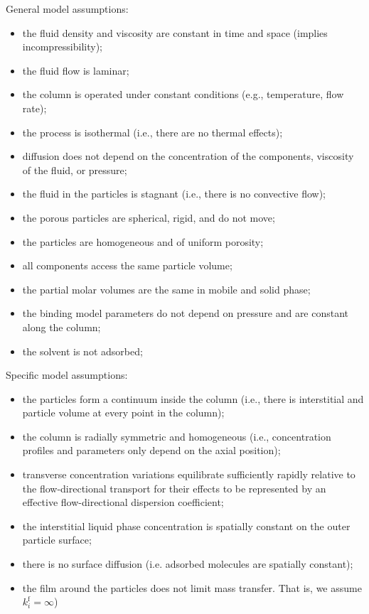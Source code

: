 \documentclass{article}
\begin{document}
General model assumptions:
\begin{itemize}
    \item the fluid density and viscosity are constant in time and space (implies incompressibility);
    \item the fluid flow is laminar;
    \item the column is operated under constant conditions (e.g., temperature, flow rate);
    \item the process is isothermal (i.e., there are no thermal effects);
    \item diffusion does not depend on the concentration of the components, viscosity of the fluid, or pressure;
    \item the fluid in the particles is stagnant (i.e., there is no convective flow);
    \item the porous particles are spherical, rigid, and do not move;
    \item the particles are homogeneous and of uniform porosity;
    \item all components access the same particle volume;
    \item the partial molar volumes are the same in mobile and solid phase;
    \item the binding model parameters do not depend on pressure and are constant along the column;
    \item the solvent is not adsorbed;
\end{itemize}

Specific model assumptions:
\begin{itemize}
    \item the particles form a continuum inside the column (i.e., there is interstitial and particle volume at every point in the column);
    \item the column is radially symmetric and homogeneous (i.e., concentration profiles and parameters only depend on the axial position);
    \item transverse concentration variations equilibrate sufficiently rapidly relative to the flow-directional transport for their effects to be represented by an effective flow-directional dispersion coefficient;
    \item the interstitial liquid phase concentration is spatially constant on the outer particle surface;
    \item there is no surface diffusion (i.e. adsorbed molecules are spatially constant);
    \item the film around the particles does not limit mass transfer. That is, we assume $k^{\mathrm{f}}_{i} = \infty$)
\end{itemize}
\end{document}
